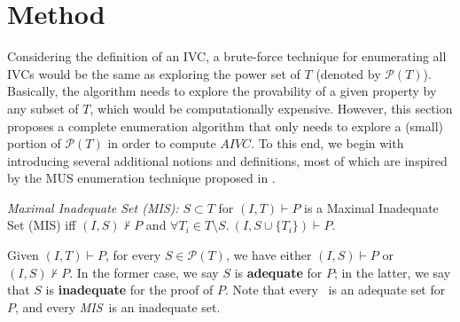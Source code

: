 \section{Method}
\label{sec:allivcs}

\newcommand{\getivc}{\textsc{GetIVC}}
\newcommand{\getmodel}{\textsc{GetLiteralsFromMaxModel}}
\newcommand{\aivcalg}{\texttt{\small{All\_IVCs}}}
\newcommand{\blockup}{\textsc{BlockUp}}
\newcommand{\blockdown}{\textsc{BlockDown}}
\newcommand{\mis}{\textit{MIS}}
\newcommand{\mcs}{\textit{MCS}}


\newcommand{\checksat}{\textsc{CheckSat}}
\newcommand{\isadeq}{\textsc{CheckAdq}}
\newcommand{\actlit}{\textsc{ActLit}}
\newcommand{\unsatcore}{\textsc{UnsatCore}\xspace}
\newcommand{\unsat}{\texttt{UNSAT}\xspace}
\newcommand{\sat}{\texttt{SAT}\xspace}

Considering the definition of an IVC, a brute-force technique for enumerating all IVCs would be the same as exploring the power set of $T$ (denoted by $ \mathcal{P}(T) $).
Basically, the algorithm needs to explore the provability of a
given property by any subset of $T$, which would be computationally expensive.
However, this section proposes a complete
enumeration algorithm that only needs to explore a (small) portion of $\mathcal{P}(T)$
in order to compute $AIVC$. To this end, we begin with introducing several additional notions and definitions, most of which are inspired by the MUS enumeration technique proposed in \cite{marco2016fast}.

\begin{definition}{\emph{Maximal Inadequate Set (\mis):}}
  \label{def:mis}
  $S \subset T$ for $(I, T) \vdash P$ is a Maximal Inadequate Set (MIS) iff
  $(I, S) \nvdash P$ and $\forall T_i \in T\setminus S.~ (I, S\cup\{T_i\}) \vdash P$.
\end{definition}

Given $(I, T) \vdash P$, for every $S \in \mathcal{P}(T)$, we have either $(I, S) \vdash P$ or $(I, S) \nvdash P$. In the former case, we say $S$ is \textbf{adequate} for $P$; in the latter, we say that $S$ is \textbf{inadequate} for the proof of $P$.
Note that every \ivc ~is an adequate set for $P$, and every \mis ~is an inadequate set.


